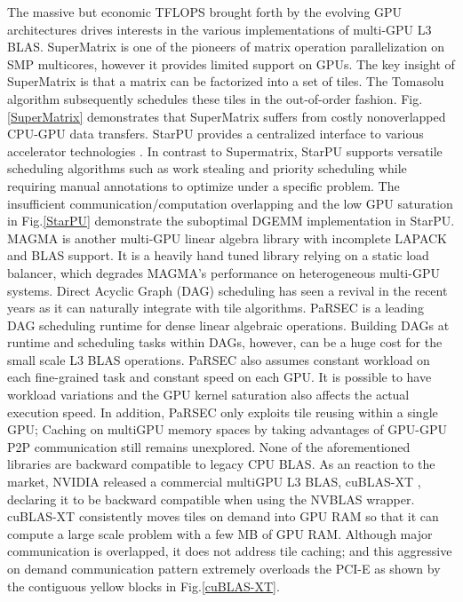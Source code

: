 \documentclass[conference]{IEEEtran}
\begin{document}
The massive but economic TFLOPS brought forth by the evolving GPU architectures drives 
interests in the various implementations of multi-GPU L3 BLAS. SuperMatrix \cite{SuperMatrix} 
is one of the pioneers of matrix operation parallelization on SMP multicores, however it 
provides limited support on GPUs. The key insight of SuperMatrix is that a matrix can be 
factorized into a set of tiles. The Tomasolu algorithm \cite{Tomasulo} subsequently 
schedules these tiles in the out-of-order fashion. Fig.\ref{SuperMatrix} demonstrates that
SuperMatrix suffers from costly nonoverlapped CPU-GPU data transfers. StarPU 
provides a centralized interface to various accelerator technologies \cite{StarPU}. 
In contrast to Supermatrix, StarPU supports versatile scheduling algorithms such as work 
stealing \cite{work_stealing} and priority scheduling \cite{priority_scheduling} while requiring 
manual annotations to optimize under a specific problem. The insufficient communication/computation overlapping and the 
low GPU saturation in Fig.\ref{StarPU} demonstrate the suboptimal DGEMM implementation
in StarPU. MAGMA \cite{Nath} is another multi-GPU linear algebra library with incomplete 
LAPACK and BLAS support. It is a heavily hand tuned library relying on a static load balancer,
which degrades MAGMA's performance on heterogeneous multi-GPU systems. 
Direct Acyclic Graph (DAG) scheduling has seen a revival in the recent years as it can naturally integrate
with tile algorithms. PaRSEC \cite{PaRSEC} is a leading DAG scheduling runtime for 
dense linear algebraic operations. Building DAGs at runtime and scheduling tasks within DAGs, however, 
can be a huge cost for the small scale L3 BLAS operations. PaRSEC also assumes constant 
workload on each fine-grained task and constant speed on each GPU. It is possible 
to have workload variations and the GPU kernel saturation also affects the actual execution 
speed. In addition, PaRSEC only exploits tile reusing within a single GPU; Caching on 
multiGPU memory spaces by taking advantages of GPU-GPU P2P communication still remains unexplored.
None of the aforementioned libraries are backward compatible to legacy CPU BLAS. As an reaction 
to the market, NVIDIA released a commercial multiGPU L3 BLAS, cuBLAS-XT \cite{cuBLASXT}, declaring it to be 
backward compatible when using the NVBLAS wrapper. cuBLAS-XT consistently 
moves tiles on demand into GPU RAM so that it can compute a large scale problem 
with a few MB of GPU RAM. Although major communication is overlapped, it does 
not address tile caching; and this aggressive on demand communication pattern extremely overloads 
the PCI-E as shown by the contiguous yellow blocks in Fig.\ref{cuBLAS-XT}. 
\end{document}
